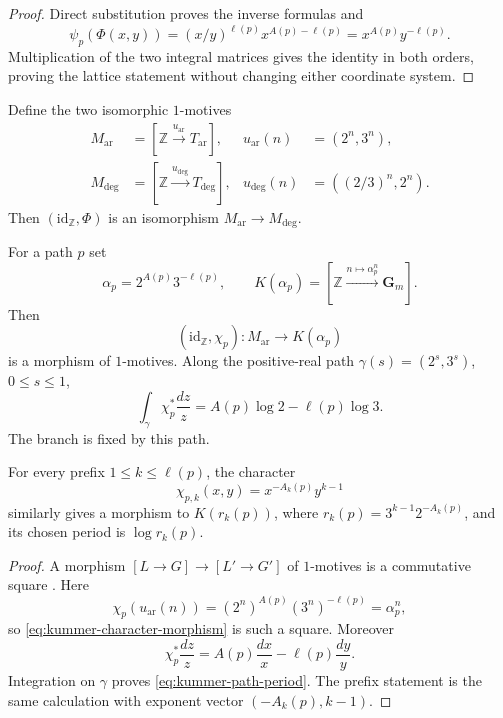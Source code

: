 \begin{proof}
Direct substitution proves the inverse formulas and
\[
 \psi_p(\Phi(x,y))=(x/y)^{\ell(p)}x^{A(p)-\ell(p)}
 =x^{A(p)}y^{-\ell(p)}.
\]
Multiplication of the two integral matrices gives the identity in both
orders, proving the lattice statement without changing either coordinate
system.
\end{proof}

Define the two isomorphic $1$-motives
\begin{align}
 M_{\mathrm{ar}}&=
 [\mathbb Z\xrightarrow{u_{\mathrm{ar}}}T_{\mathrm{ar}}],
 &u_{\mathrm{ar}}(n)&=(2^n,3^n),\label{eq:arithmetic-one-motive}\\
 M_{\deg}&=
 [\mathbb Z\xrightarrow{u_{\deg}}T_{\deg}],
 &u_{\deg}(n)&=((2/3)^n,2^n).\label{eq:degree-one-motive}
\end{align}
Then $(\mathrm{id}_{\mathbb Z},\Phi)$ is an isomorphism
$M_{\mathrm{ar}}\to M_{\deg}$.

\begin{theorem}
\label{thm:kummer-character-morphisms}
For a path $p$ set
\[
 \alpha_p=2^{A(p)}3^{-\ell(p)},
 \qquad
 K(\alpha_p)=[\mathbb Z\xrightarrow{n\mapsto\alpha_p^n}\mathbf G_m].
\]
Then
\begin{equation}
\label{eq:kummer-character-morphism}
 (\mathrm{id}_{\mathbb Z},\chi_p):M_{\mathrm{ar}}\longrightarrow K(\alpha_p)
\end{equation}
is a morphism of $1$-motives.  Along the positive-real path
$\gamma(s)=(2^s,3^s)$, $0\leq s\leq1$,
\begin{equation}
\label{eq:kummer-path-period}
 \int_\gamma\chi_p^*\frac{dz}{z}
 =A(p)\log2-\ell(p)\log3.
\end{equation}
The branch is fixed by this path.

For every prefix $1\leq k\leq\ell(p)$, the character
\[
 \chi_{p,k}(x,y)=x^{-A_k(p)}y^{k-1}
\]
similarly gives a morphism to $K(r_k(p))$, where
$r_k(p)=3^{k-1}2^{-A_k(p)}$, and its chosen period is $\log r_k(p)$.
\end{theorem}

\begin{proof}
A morphism $[L\to G]\to[L'\to G']$ of $1$-motives is a commutative
square \cite[Definition~8.1]{HuberWustholz2022}.  Here
\[
 \chi_p(u_{\mathrm{ar}}(n))
 =(2^n)^{A(p)}(3^n)^{-\ell(p)}=\alpha_p^n,
\]
so \eqref{eq:kummer-character-morphism} is such a square.  Moreover
\[
 \chi_p^*\frac{dz}{z}=A(p)\frac{dx}{x}-\ell(p)\frac{dy}{y}.
\]
Integration on $\gamma$ proves \eqref{eq:kummer-path-period}.  The prefix
statement is the same calculation with exponent vector
$(-A_k(p),k-1)$.
\end{proof}

